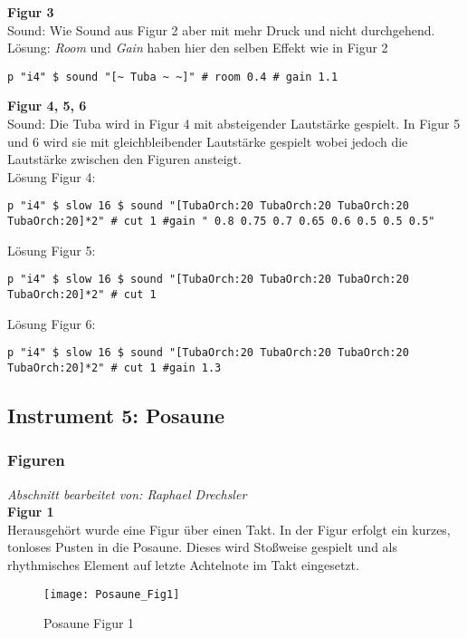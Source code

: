 \documentclass[
10pt, %
a4paper, %
oneside, %
headinclude,footinclude, %
BCOR5mm, %
]{scrartcl}
\begin{document}
\noindent\textbf{Figur 3}\\
Sound: Wie Sound aus Figur 2 aber mit mehr Druck und nicht durchgehend.\\
Lösung: \textit{Room} und \textit{Gain} haben hier den selben Effekt wie in Figur 2\\
\begin{lstlisting}
p "i4" $ sound "[~ Tuba ~ ~]" # room 0.4 # gain 1.1
\end{lstlisting}
\noindent\textbf{Figur 4, 5, 6}\\
Sound: Die Tuba wird in Figur 4 mit absteigender Lautstärke gespielt. In Figur 5 und 6 wird sie mit gleichbleibender Lautstärke gespielt wobei jedoch die Lautstärke
zwischen den Figuren ansteigt.\\
Lösung Figur 4:\\
\begin{lstlisting}
p "i4" $ slow 16 $ sound "[TubaOrch:20 TubaOrch:20 TubaOrch:20 TubaOrch:20]*2" # cut 1 #gain " 0.8 0.75 0.7 0.65 0.6 0.5 0.5 0.5"
\end{lstlisting}
Lösung Figur 5:\\
\begin{lstlisting}
p "i4" $ slow 16 $ sound "[TubaOrch:20 TubaOrch:20 TubaOrch:20 TubaOrch:20]*2" # cut 1 
\end{lstlisting}
Lösung Figur 6:\\
\begin{lstlisting}
p "i4" $ slow 16 $ sound "[TubaOrch:20 TubaOrch:20 TubaOrch:20 TubaOrch:20]*2" # cut 1 #gain 1.3
\end{lstlisting}

\subsection{Instrument 5: Posaune}
\subsubsection{Figuren}
\textit{Abschnitt bearbeitet von: Raphael Drechsler}\\

\noindent\textbf{Figur 1}\\
Herausgehört wurde eine Figur über einen Takt. In der Figur erfolgt ein kurzes, tonloses Pusten in die Posaune. Dieses wird Stoßweise gespielt und als rhythmisches Element auf letzte Achtelnote im Takt eingesetzt.\\
\begin{figure}[h]
	\centering 
	\texttt{[image: Posaune\_Fig1]} 
	\caption{Posaune Figur 1}
\end{figure}
\end{document}

